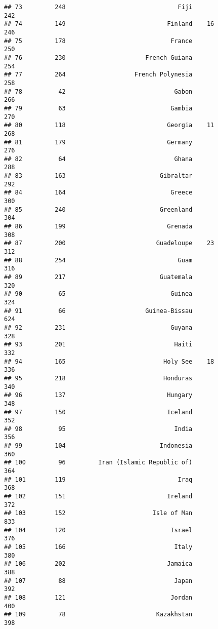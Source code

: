 \documentclass[]{article}
\begin{document}
\begin{verbatim}
## 73         248                               Fiji                242
## 74         149                            Finland    16          246
## 75         178                             France                250
## 76         230                      French Guiana                254
## 77         264                   French Polynesia                258
## 78          42                              Gabon                266
## 79          63                             Gambia                270
## 80         118                            Georgia    11          268
## 81         179                            Germany                276
## 82          64                              Ghana                288
## 83         163                          Gibraltar                292
## 84         164                             Greece                300
## 85         240                          Greenland                304
## 86         199                            Grenada                308
## 87         200                         Guadeloupe    23          312
## 88         254                               Guam                316
## 89         217                          Guatemala                320
## 90          65                             Guinea                324
## 91          66                      Guinea-Bissau                624
## 92         231                             Guyana                328
## 93         201                              Haiti                332
## 94         165                           Holy See    18          336
## 95         218                           Honduras                340
## 96         137                            Hungary                348
## 97         150                            Iceland                352
## 98          95                              India                356
## 99         104                          Indonesia                360
## 100         96         Iran (Islamic Republic of)                364
## 101        119                               Iraq                368
## 102        151                            Ireland                372
## 103        152                        Isle of Man                833
## 104        120                             Israel                376
## 105        166                              Italy                380
## 106        202                            Jamaica                388
## 107         88                              Japan                392
## 108        121                             Jordan                400
## 109         78                         Kazakhstan                398

\end{verbatim}
\end{document}
